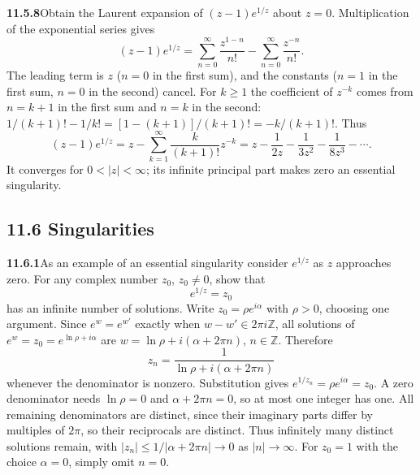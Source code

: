 \par\bigskip
\noindent\textbf{11.5.8}\quad Obtain the Laurent expansion of
$(z-1)e^{1/z}$ about $z=0$.
\solution
Multiplication of the exponential series gives
\[
(z-1)e^{1/z}
=\sum_{n=0}^\infty\frac{z^{1-n}}{n!}
-\sum_{n=0}^\infty\frac{z^{-n}}{n!}.
\]
The leading term is $z$ ($n=0$ in the first sum), and the constants
($n=1$ in the first sum, $n=0$ in the second) cancel. For $k\ge1$ the
coefficient of $z^{-k}$ comes from $n=k+1$ in the first sum and $n=k$
in the second:
$1/(k+1)!-1/k!=[1-(k+1)]/(k+1)!=-k/(k+1)!$. Thus
\[
\boxed{(z-1)e^{1/z}
=z-\sum_{k=1}^\infty\frac{k}{(k+1)!}z^{-k}
=z-\frac1{2z}-\frac1{3z^2}-\frac1{8z^3}-\cdots}.
\]
It converges for $0<|z|<\infty$; its infinite principal part
makes zero an essential singularity.

\subsection*{11.6 Singularities}

\par\bigskip
\noindent\textbf{11.6.1}\quad As an example of an essential singularity
consider $e^{1/z}$ as $z$ approaches zero. For any complex number $z_{0}$,
$z_{0}\neq0$, show that
\[
e^{1/z}=z_{0}
\]
has an infinite number of solutions.
\solution
Write $z_0=\rho e^{i\alpha}$ with $\rho>0$, choosing one argument.
Since $e^w=e^{w'}$ exactly when $w-w'\in2\pi i\mathbb Z$, all solutions
of $e^w=z_0=e^{\ln\rho+i\alpha}$ are
$w=\ln\rho+i(\alpha+2\pi n)$, $n\in\mathbb Z$.
Therefore
\[
\boxed{z_n=\frac1{\ln\rho+i(\alpha+2\pi n)}}
\]
whenever the denominator is nonzero.
Substitution gives $e^{1/z_n}=\rho e^{i\alpha}=z_0$.
A zero denominator needs $\ln\rho=0$ and $\alpha+2\pi n=0$, so at most
one integer has one. All remaining denominators are distinct, since
their imaginary parts differ by multiples of $2\pi$, so their
reciprocals are distinct. Thus infinitely many distinct solutions
remain, with $|z_n|\le1/|\alpha+2\pi n|\to0$ as $|n|\to\infty$.
For $z_0=1$ with the choice $\alpha=0$, simply omit $n=0$.


